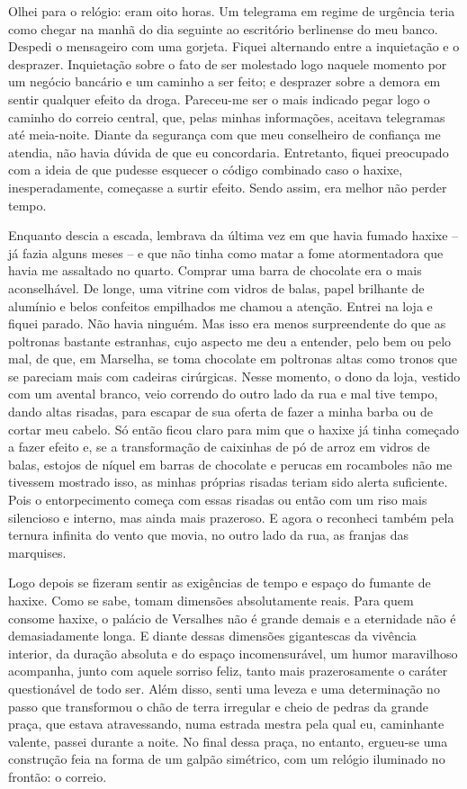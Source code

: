 Olhei para o relógio: eram oito horas. Um telegrama em regime de
urgência teria como chegar na manhã do dia seguinte ao escritório
berlinense do meu banco. Despedi o mensageiro com uma gorjeta. Fiquei
alternando entre a inquietação e o desprazer. Inquietação sobre o fato
de ser molestado logo naquele momento por um negócio bancário e um
caminho a ser feito; e desprazer sobre a demora em sentir qualquer
efeito da droga. Pareceu-me ser o mais indicado pegar logo o caminho do
correio central, que, pelas minhas informações, aceitava telegramas até
meia-noite. Diante da segurança com que meu conselheiro de confiança me
atendia, não havia dúvida de que eu concordaria. Entretanto, fiquei
preocupado com a ideia de que pudesse esquecer o código combinado caso o
haxixe, inesperadamente, começasse a surtir efeito. Sendo assim, era
melhor não perder tempo.

Enquanto descia a escada, lembrava da última vez em que havia fumado
haxixe -- já fazia alguns meses -- e que não tinha como matar a fome
atormentadora que havia me assaltado no quarto. Comprar uma barra de
chocolate era o mais aconselhável. De longe, uma vitrine com vidros de
balas, papel brilhante de alumínio e belos confeitos empilhados me
chamou a atenção. Entrei na loja e fiquei parado. Não havia ninguém. Mas
isso era menos surpreendente do que as poltronas bastante estranhas,
cujo aspecto me deu a entender, pelo bem ou pelo mal, de que, em
Marselha, se toma chocolate em poltronas altas como tronos que se
pareciam mais com cadeiras cirúrgicas. Nesse momento, o dono da loja,
vestido com um avental branco, veio correndo do outro lado da rua e mal
tive tempo, dando altas risadas, para escapar de sua oferta de fazer a
minha barba ou de cortar meu cabelo. Só então ficou claro para mim que o
haxixe já tinha começado a fazer efeito e, se a transformação de
caixinhas de pó de arroz em vidros de balas, estojos de níquel em barras
de chocolate e perucas em rocamboles não me tivessem mostrado isso, as
minhas próprias risadas teriam sido alerta suficiente. Pois o
entorpecimento começa com essas risadas ou então com um riso mais
silencioso e interno, mas ainda mais prazeroso. E agora o reconheci
também pela ternura infinita do vento que movia, no outro lado da rua,
as franjas das marquises.

Logo depois se fizeram sentir as exigências de tempo e espaço do fumante
de haxixe. Como se sabe, tomam dimensões absolutamente reais. Para quem
consome haxixe, o palácio de Versalhes não é grande demais e a
eternidade não é demasiadamente longa. E diante dessas dimensões
gigantescas da vivência interior, da duração absoluta e do espaço
incomensurável, um humor maravilhoso acompanha, junto com aquele sorriso
feliz, tanto mais prazerosamente o caráter questionável de todo ser.
Além disso, senti uma leveza e uma determinação no passo que transformou
o chão de terra irregular e cheio de pedras da grande praça, que estava
atravessando, numa estrada mestra pela qual eu, caminhante valente,
passei durante a noite. No final dessa praça, no entanto, ergueu-se uma
construção feia na forma de um galpão simétrico, com um relógio
iluminado no frontão: o correio.

